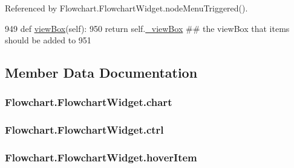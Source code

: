 Referenced by Flowchart.\+Flowchart\+Widget.\+node\+Menu\+Triggered().


\begin{DoxyCode}
949     \textcolor{keyword}{def }\hyperlink{classFlowchart_1_1FlowchartWidget_ae77a962800938c1017e7fca2f59a837d}{viewBox}(self):
950         \textcolor{keywordflow}{return} self.\hyperlink{classFlowchart_1_1FlowchartWidget_ad71dd8d28c3339ceba6d35ff2767ad20}{\_viewBox} \textcolor{comment}{## the viewBox that items should be added to}
951 
\end{DoxyCode}


\subsection{Member Data Documentation}
\hypertarget{classFlowchart_1_1FlowchartWidget_a3eea10235556d1d25b05c4e5f37fa324}{}
\subsubsection[{chart}]{\setlength{\rightskip}{0pt plus 5cm}Flowchart.\+Flowchart\+Widget.\+chart}\label{classFlowchart_1_1FlowchartWidget_a3eea10235556d1d25b05c4e5f37fa324}
\hypertarget{classFlowchart_1_1FlowchartWidget_adf3b7937106a3e532bd2d56ea9df365d}{}
\subsubsection[{ctrl}]{\setlength{\rightskip}{0pt plus 5cm}Flowchart.\+Flowchart\+Widget.\+ctrl}\label{classFlowchart_1_1FlowchartWidget_adf3b7937106a3e532bd2d56ea9df365d}
\hypertarget{classFlowchart_1_1FlowchartWidget_a00653ef4736026c5bf0aae462690d250}{}
\subsubsection[{hover\+Item}]{\setlength{\rightskip}{0pt plus 5cm}Flowchart.\+Flowchart\+Widget.\+hover\+Item}\label{classFlowchart_1_1FlowchartWidget_a00653ef4736026c5bf0aae462690d250}
\hypertarget{classFlowchart_1_1FlowchartWidget_a6a0ee2e46f74471223f93826c63cc2dc}{}
